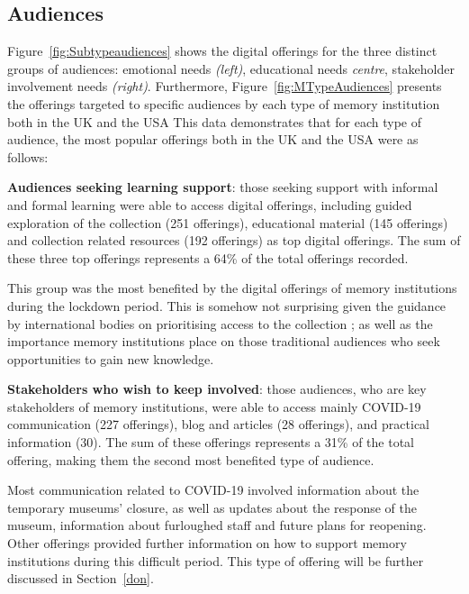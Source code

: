 \documentclass{egpubl}
\begin{document}

\subsection{Audiences}
\label{aud}
Figure~\ref{fig:Subtypeaudiences} shows the digital offerings for the three distinct groups of audiences: emotional needs  \emph{(left)}, educational needs \emph{centre}, stakeholder involvement needs \emph{(right)}. Furthermore, Figure~\ref{fig:MTypeAudiences} presents the offerings targeted to specific audiences by each type of memory institution both in the UK and the USA This data demonstrates that for each type of audience, the most popular offerings both in the UK and the USA were as follows:

\noindent \textbf{Audiences seeking learning support}: those seeking support with informal and formal learning were able to access digital offerings, including guided exploration of the collection (251 offerings), educational material (145 offerings) and collection related resources (192 offerings) as top digital offerings. The sum of these three top offerings represents a 64\% of the total offerings recorded. 

This group was the most benefited by the digital offerings of memory institutions during the lockdown period. This is somehow not surprising given the guidance by international bodies on prioritising access to the collection \cite{InternationalCouncilofMuseums2020}; as well as the importance memory institutions place on those traditional audiences who seek opportunities to gain new knowledge. 



\noindent \textbf{Stakeholders who wish to keep involved}: those audiences, who are key stakeholders of memory institutions, were able to access mainly COVID-19 communication (227 offerings), blog and articles (28 offerings), and practical information (30). The sum of these offerings represents a 31\% of the total offering, making them the second most benefited type of audience. 

Most communication related to COVID-19 involved information about the temporary museums' closure, as well as updates about the response of the museum, information about furloughed staff and future plans for reopening. Other offerings provided further information on how to support memory institutions during this difficult period. This type of offering will be further discussed in Section~\ref{don}.
\end{document}
